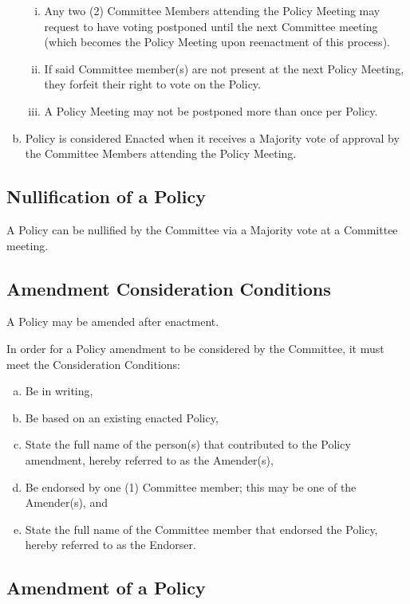 \documentclass[a4paper,12pt]{article}
\begin{document}
\begin{enumerate}[a)]
	\begin{enumerate}[i)]
		\item Any two (2) Committee Members attending the Policy Meeting may request to have voting postponed until the next Committee meeting (which becomes the Policy Meeting upon reenactment of this process).
		\item If said Committee member(s) are not present at the next Policy Meeting, they forfeit their right to vote on the Policy.
		\item A Policy Meeting may not be postponed more than once per Policy.
	\end{enumerate}
	\item Policy is considered Enacted when it receives a Majority vote of approval by the Committee Members attending the Policy Meeting.
\end{enumerate}

\subsection{Nullification of a Policy}

A Policy can be nullified by the Committee via a Majority vote at a Committee meeting.

\subsection{Amendment Consideration Conditions}

A Policy may be amended after enactment.

In order for a Policy amendment to be considered by the Committee, it must meet the Consideration Conditions:

\begin{enumerate}[a)]
	\item Be in writing,
	\item Be based on an existing enacted Policy,
	\item State the full name of the person(s) that contributed to the Policy amendment, hereby referred to as the Amender(s),
	\item Be endorsed by one (1) Committee member; this may be one of the Amender(s), and
	\item State the full name of the Committee member that endorsed the Policy, hereby referred to as the Endorser.
\end{enumerate}

\subsection{Amendment of a Policy}
\end{document}
